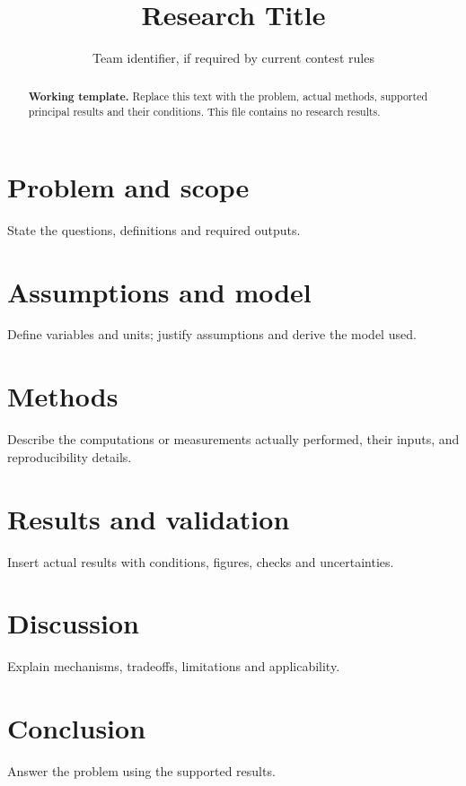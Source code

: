\documentclass[11pt,a4paper]{article}
\title{Research Title}
\author{Team identifier, if required by current contest rules}
\date{}
\begin{document}
\maketitle
\begin{abstract}
\textbf{Working template.} Replace this text with the problem, actual methods, supported principal results and their conditions. This file contains no research results.
\end{abstract}
\section{Problem and scope}
State the questions, definitions and required outputs.
\section{Assumptions and model}
Define variables and units; justify assumptions and derive the model used.
\section{Methods}
Describe the computations or measurements actually performed, their inputs, and reproducibility details.
\section{Results and validation}
Insert actual results with conditions, figures, checks and uncertainties.
\section{Discussion}
Explain mechanisms, tradeoffs, limitations and applicability.
\section{Conclusion}
Answer the problem using the supported results.
\end{document}
